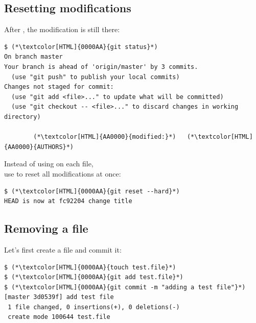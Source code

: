 \subsection{Resetting modifications}
\begin{frame}[fragile]
\subslidetitle
  After , the modification is still there:
\begin{lstlisting}
$ (*\textcolor[HTML]{0000AA}{git status}*)
On branch master
Your branch is ahead of 'origin/master' by 3 commits.
  (use "git push" to publish your local commits)
Changes not staged for commit:
  (use "git add <file>..." to update what will be committed)
  (use "git checkout -- <file>..." to discard changes in working directory)

        (*\textcolor[HTML]{AA0000}{modified:}*)   (*\textcolor[HTML]{AA0000}{AUTHORS}*)
\end{lstlisting}

  Instead of using  on each file, \\
  use  to reset all modifications at once:
\begin{lstlisting}
$ (*\textcolor[HTML]{0000AA}{git reset --hard}*)
HEAD is now at fc92204 change title
\end{lstlisting}
\end{frame}

\subsection{Removing a file}
\begin{frame}[fragile]
\subslidetitle
  Let's first create a file and commit it:
\begin{lstlisting}
$ (*\textcolor[HTML]{0000AA}{touch test.file}*)
$ (*\textcolor[HTML]{0000AA}{git add test.file}*)
$ (*\textcolor[HTML]{0000AA}{git commit -m "adding a test file"}*)
[master 3d0539f] add test file
 1 file changed, 0 insertions(+), 0 deletions(-)
 create mode 100644 test.file
\end{lstlisting}
\end{frame}

